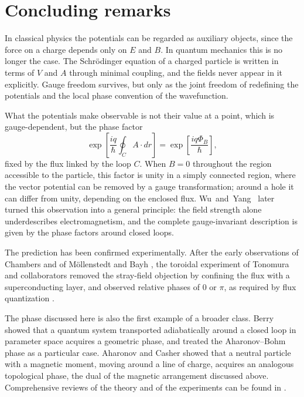 \section{Concluding remarks}
\label{sec:concluding-remarks}

In classical physics the potentials can be regarded as auxiliary objects,
since the force on a charge depends only on \(E\) and \(B\). In quantum
mechanics this is no longer the case. The Schrödinger equation of a charged
particle is written in terms of \(V\) and \(A\) through minimal coupling, and
the fields never appear in it explicitly. Gauge freedom survives, but only as
the joint freedom of redefining the potentials and the local phase convention
of the wavefunction.

What the potentials make observable is not their value at a point, which is
gauge-dependent, but the phase factor
\[
	\exp \left[ \frac{iq}{\hbar} \oint_C A \cdot dr \right]
	= \exp \left[ \frac{iq\Phi_B}{\hbar} \right],
\]
fixed by the flux linked by the loop \(C\). When \(B = 0\) throughout the
region accessible to the particle, this factor is unity in a simply connected
region, where the vector potential can be removed by a gauge transformation;
around a hole it can differ from unity, depending on the enclosed flux.
Wu~and~Yang~\cite{wuConceptNonintegrablePhase1975} later turned this observation into a general principle: the field strength
alone underdescribes electromagnetism, and the complete gauge-invariant
description is given by the phase factors around closed loops.

The prediction has been confirmed experimentally. After the early observations
of Chambers \cite{chambersShiftElectronInterference1960} and of M\"ollenstedt
and Bayh \cite{mllenstedtMessungKontinuierlichenPhasenschiebung1962}, the toroidal experiment of Tonomura
and collaborators removed the stray-field objection by confining the flux with a
superconducting layer, and observed relative phases of \(0\) or \(\pi\), as
required by flux quantization \cite{tonomuraEvidenceAharonovBohmEffect1986}.

The phase discussed here is also the first example of a broader class. Berry
\cite{berryQuantalPhaseFactors1984} showed that a quantum system transported adiabatically around a closed loop in
parameter space acquires a geometric phase, and treated the Aharonov--Bohm
phase as a particular case. Aharonov and
Casher \cite{aharonovTopologicalQuantumEffects1984} showed that a neutral particle with a magnetic moment, moving around a
line of charge, acquires an analogous topological phase, the dual of the
magnetic arrangement discussed above. Comprehensive reviews of the
theory and of the experiments can be found in
\cite{olariuQuantumEffectsElectromagnetic1985,peshkinAharonovBohmEffect1989}.
